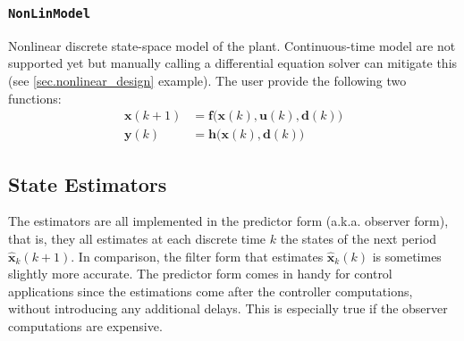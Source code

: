 \subsubsection{\texttt{NonLinModel}}

Nonlinear discrete state-space model of the plant. Continuous-time model are not supported yet but manually calling a differential equation solver can mitigate this (see \cref{sec.nonlinear_design} example). The user provide the following two functions:
\begin{subequations}
\begin{align}
    \mathbf{x}(k+1) &= \mathbf{f}\big(\mathbf{x}(k), \mathbf{u}(k), \mathbf{d}(k)\big) \\
    \mathbf{y}(k)   &= \mathbf{h}\big( \mathbf{x}(k), \mathbf{d}(k) \big)
\end{align}
\end{subequations}


\subsection{State Estimators}

The estimators are all implemented in the predictor form (a.k.a. observer form), that is, they all estimates at each discrete time $k$ the states of the next period $\mathbf{\hat{x}}_k(k+1)$. In comparison, the filter form that estimates $\mathbf{\hat{x}}_k(k)$ is sometimes slightly more accurate. The predictor form comes in handy for control applications since the estimations come after the controller computations, without introducing any additional delays. This is especially true if the observer computations are expensive.

